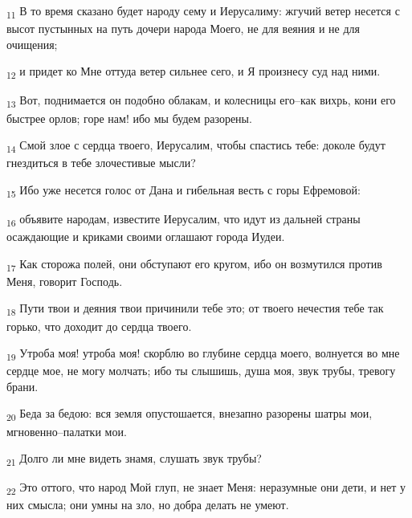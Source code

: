 \begin{tcolorbox}
\textsubscript{11} В то время сказано будет народу сему и Иерусалиму: жгучий ветер несется с высот пустынных на путь дочери народа Моего, не для веяния и не для очищения;
\end{tcolorbox}
\begin{tcolorbox}
\textsubscript{12} и придет ко Мне оттуда ветер сильнее сего, и Я произнесу суд над ними.
\end{tcolorbox}
\begin{tcolorbox}
\textsubscript{13} Вот, поднимается он подобно облакам, и колесницы его--как вихрь, кони его быстрее орлов; горе нам! ибо мы будем разорены.
\end{tcolorbox}
\begin{tcolorbox}
\textsubscript{14} Смой злое с сердца твоего, Иерусалим, чтобы спастись тебе: доколе будут гнездиться в тебе злочестивые мысли?
\end{tcolorbox}
\begin{tcolorbox}
\textsubscript{15} Ибо уже несется голос от Дана и гибельная весть с горы Ефремовой:
\end{tcolorbox}
\begin{tcolorbox}
\textsubscript{16} объявите народам, известите Иерусалим, что идут из дальней страны осаждающие и криками своими оглашают города Иудеи.
\end{tcolorbox}
\begin{tcolorbox}
\textsubscript{17} Как сторожа полей, они обступают его кругом, ибо он возмутился против Меня, говорит Господь.
\end{tcolorbox}
\begin{tcolorbox}
\textsubscript{18} Пути твои и деяния твои причинили тебе это; от твоего нечестия тебе так горько, что доходит до сердца твоего.
\end{tcolorbox}
\begin{tcolorbox}
\textsubscript{19} Утроба моя! утроба моя! скорблю во глубине сердца моего, волнуется во мне сердце мое, не могу молчать; ибо ты слышишь, душа моя, звук трубы, тревогу брани.
\end{tcolorbox}
\begin{tcolorbox}
\textsubscript{20} Беда за бедою: вся земля опустошается, внезапно разорены шатры мои, мгновенно--палатки мои.
\end{tcolorbox}
\begin{tcolorbox}
\textsubscript{21} Долго ли мне видеть знамя, слушать звук трубы?
\end{tcolorbox}
\begin{tcolorbox}
\textsubscript{22} Это оттого, что народ Мой глуп, не знает Меня: неразумные они дети, и нет у них смысла; они умны на зло, но добра делать не умеют.
\end{tcolorbox}
